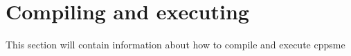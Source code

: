 \chapter{Compiling and executing}
This section will contain information about how to compile and execute
cppsme 



